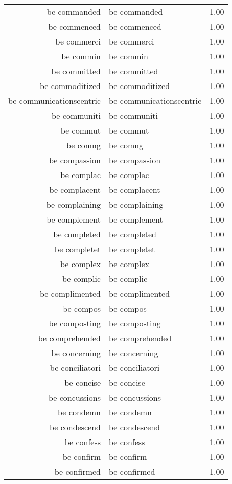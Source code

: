 \begin{table}[ht]
\begin{tabular}{rlr}
  be commanded & be commanded & 1.00 \\ 
  be commenced & be commenced & 1.00 \\ 
  be commerci & be commerci & 1.00 \\ 
  be commin & be commin & 1.00 \\ 
  be committed & be committed & 1.00 \\ 
  be commoditized & be commoditized & 1.00 \\ 
  be communicationscentric & be communicationscentric & 1.00 \\ 
  be communiti & be communiti & 1.00 \\ 
  be commut & be commut & 1.00 \\ 
  be comng & be comng & 1.00 \\ 
  be compassion & be compassion & 1.00 \\ 
  be complac & be complac & 1.00 \\ 
  be complacent & be complacent & 1.00 \\ 
  be complaining & be complaining & 1.00 \\ 
  be complement & be complement & 1.00 \\ 
  be completed & be completed & 1.00 \\ 
  be completet & be completet & 1.00 \\ 
  be complex & be complex & 1.00 \\ 
  be complic & be complic & 1.00 \\ 
  be complimented & be complimented & 1.00 \\ 
  be compos & be compos & 1.00 \\ 
  be composting & be composting & 1.00 \\ 
  be comprehended & be comprehended & 1.00 \\ 
  be concerning & be concerning & 1.00 \\ 
  be conciliatori & be conciliatori & 1.00 \\ 
  be concise & be concise & 1.00 \\ 
  be concussions & be concussions & 1.00 \\ 
  be condemn & be condemn & 1.00 \\ 
  be condescend & be condescend & 1.00 \\ 
  be confess & be confess & 1.00 \\ 
  be confirm & be confirm & 1.00 \\ 
  be confirmed & be confirmed & 1.00 \\ 

\end{tabular}
\end{table}
